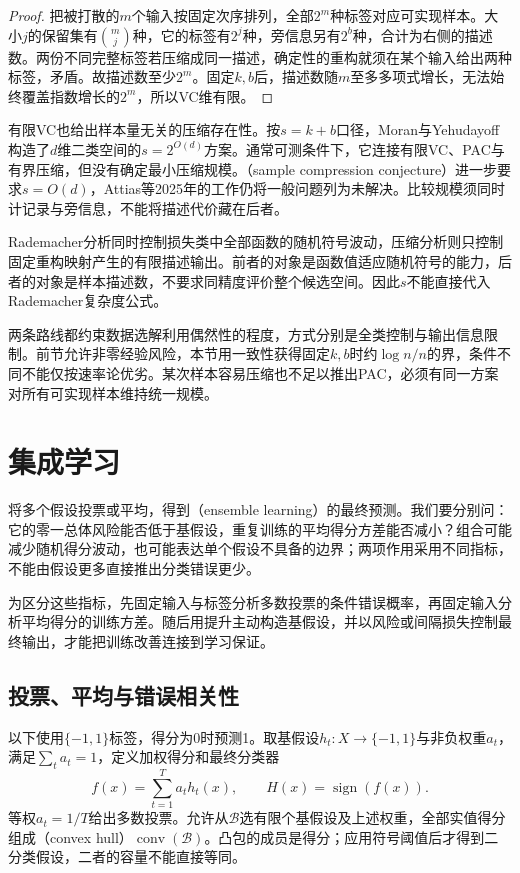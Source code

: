 \begin{proof}
把被打散的$m$个输入按固定次序排列，全部$2^m$种标签对应可实现样本。大小$j$的保留集有$\binom mj$种，它的标签有$2^j$种，旁信息另有$2^b$种，合计为右侧的描述数。两份不同完整标签若压缩成同一描述，确定性的重构就须在某个输入给出两种标签，矛盾。故描述数至少$2^m$。固定$k,b$后，描述数随$m$至多多项式增长，无法始终覆盖指数增长的$2^m$，所以VC维有限。
\end{proof}

有限VC也给出样本量无关的压缩存在性。按$s=k+b$口径，Moran与Yehudayoff构造了$d$维二类空间的$s=2^{O(d)}$方案。通常可测条件下，它连接有限VC、PAC与有界压缩，但没有确定最小压缩规模。（sample compression conjecture）进一步要求$s=O(d)$，Attias等2025年的工作仍将一般问题列为未解决。比较规模须同时计记录与旁信息，不能将描述代价藏在后者。

Rademacher分析同时控制损失类中全部函数的随机符号波动，压缩分析则只控制固定重构映射产生的有限描述输出。前者的对象是函数值适应随机符号的能力，后者的对象是样本描述数，不要求同精度评价整个候选空间。因此$s$不能直接代入Rademacher复杂度公式。

两条路线都约束数据选解利用偶然性的程度，方式分别是全类控制与输出信息限制。前节允许非零经验风险，本节用一致性获得固定$k,b$时约$\log n/n$的界，条件不同不能仅按速率论优劣。某次样本容易压缩也不足以推出PAC，必须有同一方案对所有可实现样本维持统一规模。

\section{集成学习}
\label{sec:boosting}

将多个假设投票或平均，得到（ensemble learning）的最终预测。我们要分别问：它的零一总体风险能否低于基假设，重复训练的平均得分方差能否减小？组合可能减少随机得分波动，也可能表达单个假设不具备的边界；两项作用采用不同指标，不能由假设更多直接推出分类错误更少。

为区分这些指标，先固定输入与标签分析多数投票的条件错误概率，再固定输入分析平均得分的训练方差。随后用提升主动构造基假设，并以风险或间隔损失控制最终输出，才能把训练改善连接到学习保证。

\subsection{投票、平均与错误相关性}

以下使用$\{-1,1\}$标签，得分为0时预测1。取基假设$h_t:X\to\{-1,1\}$与非负权重$a_t$，满足$\sum_ta_t=1$，定义加权得分和最终分类器
\[
 f(x)=\sum_{t=1}^T a_t h_t(x),\qquad H(x)=\operatorname{sign}(f(x)).
\]
等权$a_t=1/T$给出多数投票。允许从$\mathcal B$选有限个基假设及上述权重，全部实值得分组成（convex hull）$\operatorname{conv}(\mathcal B)$。凸包的成员是得分；应用符号阈值后才得到二分类假设，二者的容量不能直接等同。

